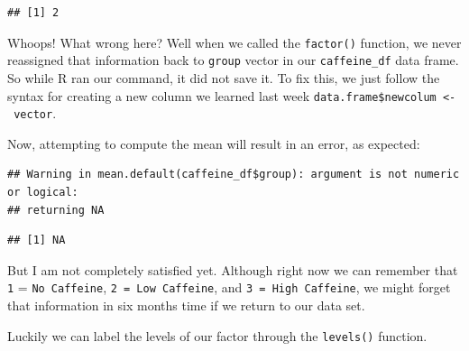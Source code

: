 \documentclass[
]{book}
\newenvironment{Shaded}{\begin{snugshade}}{\end{snugshade}}
\newcommand{\FunctionTok}[1]{\textcolor[rgb]{0.13,0.29,0.53}{\textbf{#1}}}
\newcommand{\NormalTok}[1]{#1}
\newcommand{\OtherTok}[1]{\textcolor[rgb]{0.56,0.35,0.01}{#1}}
\newcommand{\SpecialCharTok}[1]{\textcolor[rgb]{0.81,0.36,0.00}{\textbf{#1}}}
\newcommand{\StringTok}[1]{\textcolor[rgb]{0.31,0.60,0.02}{#1}}
\begin{document}
\begin{verbatim}
## [1] 2
\end{verbatim}

Whoops! What wrong here? Well when we called the \texttt{factor()} function, we never reassigned that information back to \texttt{group} vector in our \texttt{caffeine\_df} data frame. So while R ran our command, it did not save it. To fix this, we just follow the syntax for creating a new column we learned last week \texttt{data.frame\$newcolum\ \textless{}-\ vector}.

\begin{Shaded}
\end{Shaded}

Now, attempting to compute the mean will result in an error, as expected:

\begin{Shaded}
\end{Shaded}

\begin{verbatim}
## Warning in mean.default(caffeine_df$group): argument is not numeric or logical:
## returning NA
\end{verbatim}

\begin{verbatim}
## [1] NA
\end{verbatim}

But I am not completely satisfied yet. Although right now we can remember that \texttt{1} = \texttt{No\ Caffeine}, \texttt{2\ =\ Low\ Caffeine}, and \texttt{3\ =\ High\ Caffeine}, we might forget that information in six months time if we return to our data set.

Luckily we can label the levels of our factor through the \texttt{levels()} function.

\begin{Shaded}
\end{Shaded}
\end{document}

